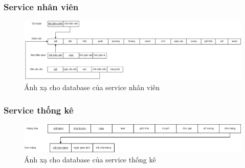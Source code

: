 \subsubsection{Service nhân viên}
\begin{figure}[!htp]
	\begin{center}
		\includegraphics[width=1\textwidth]{img/database/mapping/staff.png}
		\newline
		\caption{Ánh xạ cho database của service nhân viên}
	\end{center}
\end{figure}


\subsubsection{Service thống kê}
\begin{figure}[!htp]
	\begin{center}
		\includegraphics[width=1\textwidth]{img/database/mapping/Statistic.png}
		\newline
		\caption{Ánh xạ cho database của service thống kê}
	\end{center}
\end{figure}